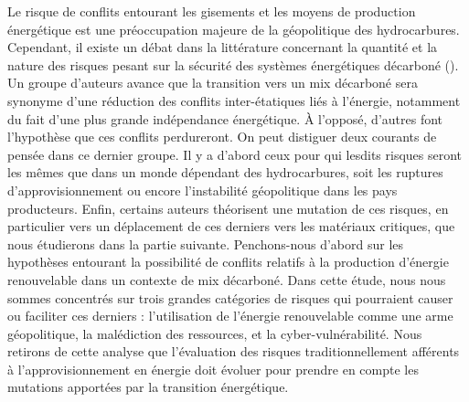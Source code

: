 Le risque de conflits entourant les gisements et les moyens de production énergétique est une préoccupation majeure de la géopolitique des hydrocarbures. Cependant, il existe un débat dans la littérature concernant la quantité et la nature des risques pesant sur la sécurité des systèmes énergétiques décarboné (\cite{vakulchuk_renewable_2020}). Un groupe d'auteurs avance que la transition vers un mix décarboné sera synonyme d'une réduction des conflits inter-étatiques liés à l'énergie, notamment du fait d'une plus grande indépendance énergétique. À l'opposé, d'autres font l'hypothèse que ces conflits perdureront. On peut distiguer deux courants de pensée dans ce dernier groupe. Il y a d'abord ceux pour qui lesdits risques seront les mêmes que dans un monde dépendant des hydrocarbures, soit les ruptures d'approvisionnement ou encore l'instabilité géopolitique dans les pays producteurs. Enfin, certains auteurs théorisent une mutation de ces risques, en particulier vers un déplacement de ces derniers vers les matériaux critiques, que nous étudierons dans la partie suivante.
\smallbreak
Penchons-nous d'abord sur les hypothèses entourant la possibilité de conflits relatifs à la production d'énergie renouvelable dans un contexte de mix décarboné. Dans cette étude, nous nous sommes concentrés sur trois grandes catégories de risques qui pourraient causer ou faciliter ces derniers : l'utilisation de l'énergie renouvelable comme une arme géopolitique, la malédiction des ressources, et la cyber-vulnérabilité. Nous retirons de cette analyse que l'évaluation des risques traditionnellement afférents à l'approvisionnement en énergie doit évoluer pour prendre en compte les mutations apportées par la transition énergétique.
